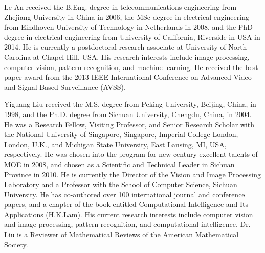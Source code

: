 \documentclass[10pt,journal]{IEEEtran}
\begin{document}
\begin{IEEEbiography}{Le An} received the B.Eng. degree in telecommunications engineering from Zhejiang University in China in 2006, the MSc degree in electrical engineering from Eindhoven University of Technology in Netherlands in 2008, and the PhD degree in electrical engineering from University of California, Riverside in USA in 2014. He is currently a postdoctoral research associate at University of North Carolina at Chapel Hill, USA.  
His research interests include image processing, computer vision, pattern recognition, and machine learning. He received the best paper award from the 2013 IEEE International Conference on Advanced Video and Signal-Based Surveillance (AVSS).
\end{IEEEbiography}

\begin{IEEEbiography}{Yiguang Liu} received the M.S. degree from Peking University, Beijing, China, in 1998, and the Ph.D. degree from Sichuan University, Chengdu, China, in 2004. He was a Research Fellow, Visiting Professor, and Senior Research Scholar with the National University of Singapore, Singapore, Imperial College London, London, U.K., and Michigan State University, East Lansing, MI, USA, respectively. He was chosen into the program for new century excellent talents of MOE in 2008, and chosen as a Scientific and Technical Leader in Sichuan Province in 2010. He is currently the Director of the Vision and Image Processing Laboratory and a Professor with the School of Computer Science, Sichuan University. He has co-authored over 100 international journal and conference papers, and a chapter of the book entitled Computational Intelligence and Its Applications (H.K.Lam). His current research interests include computer vision and image processing, pattern recognition, and computational intelligence. Dr. Liu is a Reviewer of Mathematical Reviews of the American Mathematical Society.
\end{IEEEbiography}
\end{document}
